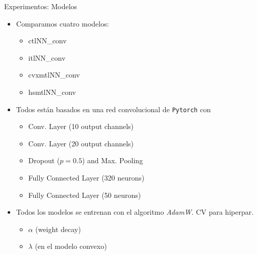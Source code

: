 \documentclass[aspectratio=43,spanish]{beamer}
\newcommand{\fmod}[1]{\textsf{#1}}
\begin{document}
\begin{frame}{Experimentos: Modelos}

      \begin{itemize}
          \item Comparamos cuatro modelos:
          \begin{itemize}
              \item \fmod{ctlNN\_conv}
              \item \fmod{itlNN\_conv}
              \item \fmod{cvxmtlNN\_conv}
              \item \fmod{hsmtlNN\_conv}
          \end{itemize}
          \item Todos están basados en una red convolucional de \texttt{Pytorch} con
          \begin{itemize}
              \item Conv. Layer (10 output channels)
              \item Conv. Layer (20 output channels)
              \item Dropout ($p=0.5$) and Max. Pooling
              \item Fully Connected Layer (320 neurons)
              \item Fully Connected Layer (50 neurons)
          \end{itemize}
          \item Todos los modelos se entrenan con el algoritmo \emph{AdamW}. CV para hiperpar.
          \begin{itemize}
            \item $\alpha$ (weight decay)
            \item $\lambda$ (en el modelo convexo)
          \end{itemize}
      \end{itemize}
  
  \end{frame}
\end{document}
